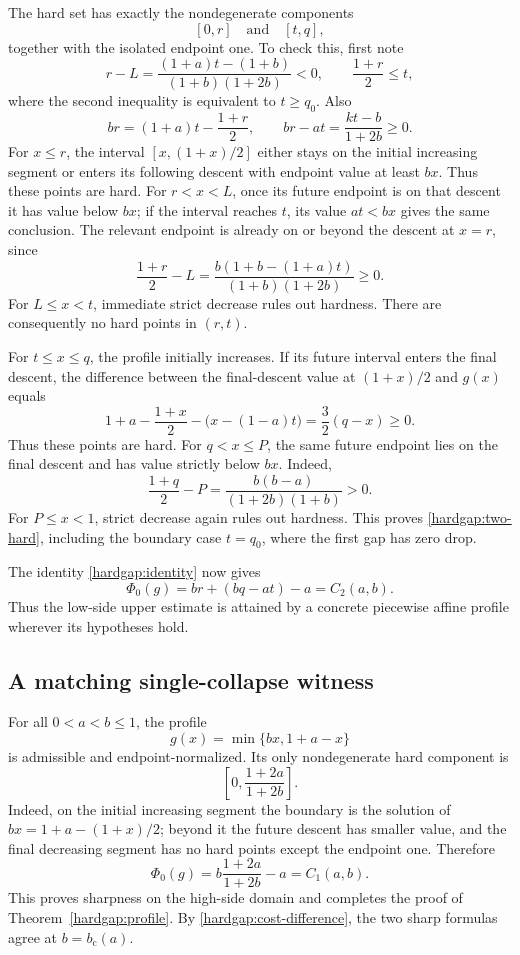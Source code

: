 The hard set has exactly the nondegenerate components
\begin{equation}\label{hardgap:two-hard}
 [0,r]\quad\text{and}\quad[t,q],
\end{equation}
together with the isolated endpoint one. To check this, first note
\[
 r-L=\frac{(1+a)t-(1+b)}{(1+b)(1+2b)}<0,
 \qquad \frac{1+r}{2}\le t,
\]
where the second inequality is equivalent to \(t\ge q_0\).
Also
\[
 br=(1+a)t-\frac{1+r}{2},\qquad
 br-at=\frac{kt-b}{1+2b}\ge0.
\]
For \(x\le r\), the interval \([x,(1+x)/2]\) either stays on the
initial increasing segment or enters its following descent with endpoint
value at least \(bx\). Thus these points are hard. For \(r<x<L\),
once its future endpoint is on that descent it has value below \(bx\);
if the interval reaches \(t\), its value \(at<bx\) gives the same
conclusion. The relevant endpoint is already on or beyond the descent at
\(x=r\), since
\[
 \frac{1+r}{2}-L
 =\frac{b(1+b-(1+a)t)}{(1+b)(1+2b)}\ge0.
\]
For \(L\le x<t\), immediate strict decrease rules out hardness.
There are consequently no hard points in \((r,t)\).

For \(t\le x\le q\), the profile initially increases. If its future
interval enters the final descent, the difference between the final-descent
value at \((1+x)/2\) and \(g(x)\) equals
\[
 1+a-\frac{1+x}{2}-\bigl(x-(1-a)t\bigr)
 =\frac32(q-x)\ge0.
\]
Thus these points are hard. For \(q<x\le P\), the same future
endpoint lies on the final descent and has value strictly below \(bx\).
Indeed,
\[
 \frac{1+q}{2}-P
 =\frac{b(b-a)}{(1+2b)(1+b)}>0.
\]
For \(P\le x<1\), strict decrease again rules out hardness.
This proves \eqref{hardgap:two-hard}, including the boundary case
\(t=q_0\), where the first gap has zero drop.

The identity \eqref{hardgap:identity} now gives
\[
 \Phi_0(g)=br+(bq-at)-a=C_2(a,b).
\]
Thus the low-side upper estimate is attained by a concrete piecewise affine
profile wherever its hypotheses hold.

\subsection{A matching single-collapse witness}
\label{hardgap:one-witness}

For all \(0<a<b\le1\), the profile
\[
 g(x)=\min\{bx,1+a-x\}
\]
is admissible and endpoint-normalized. Its only nondegenerate hard component
is
\[
 \left[0,\frac{1+2a}{1+2b}\right].
\]
Indeed, on the initial increasing segment the boundary is the solution of
\(bx=1+a-(1+x)/2\); beyond it the future descent has smaller value,
and the final decreasing segment has no hard points except the endpoint
one. Therefore
\[
 \Phi_0(g)=b\frac{1+2a}{1+2b}-a=C_1(a,b).
\]
This proves sharpness on the high-side domain and completes the proof of
Theorem~\ref{hardgap:profile}. By \eqref{hardgap:cost-difference}, the two
sharp formulas agree at \(b=b_{\mathrm c}(a)\).
